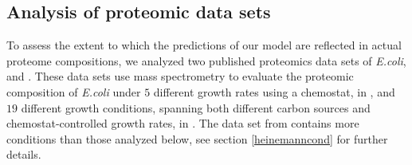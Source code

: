 \subsection{Analysis of proteomic data sets}
To assess the extent to which the predictions of our model are reflected in actual proteome compositions, we analyzed two published proteomics data sets of \emph{E.coli}, \cite{Valgepea2013} and \cite{Heinemann2014}.
These data sets use mass spectrometry to evaluate the proteomic composition of \emph{E.coli} under $5$ different growth rates using a chemostat, in \cite{Valgepea2013}, and $19$ different growth conditions, spanning both different carbon sources and chemostat-controlled growth rates, in \cite{Heinemann2014}.
The data set from \cite{Heinemann2014} contains more conditions than those analyzed below, see section \ref{heinemanncond} for further details.